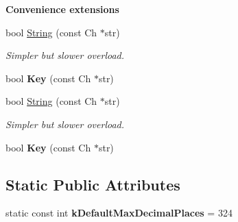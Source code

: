 \begin{Indent}{\bf Convenience extensions}\par
\begin{DoxyCompactItemize}
\item 
bool \hyperlink{class_writer_a24eb1a72b42da5fe51ff99d9c293dd11}{String} (const Ch $\ast$str)\hypertarget{class_writer_a24eb1a72b42da5fe51ff99d9c293dd11}{}\label{class_writer_a24eb1a72b42da5fe51ff99d9c293dd11}

\begin{DoxyCompactList}\small\item\em Simpler but slower overload. \end{DoxyCompactList}\item 
bool {\bfseries Key} (const Ch $\ast$str)\hypertarget{class_writer_a8a40514efe951801df6896a596ed8563}{}\label{class_writer_a8a40514efe951801df6896a596ed8563}

\item 
bool \hyperlink{class_writer_a24eb1a72b42da5fe51ff99d9c293dd11}{String} (const Ch $\ast$str)\hypertarget{class_writer_a24eb1a72b42da5fe51ff99d9c293dd11}{}\label{class_writer_a24eb1a72b42da5fe51ff99d9c293dd11}

\begin{DoxyCompactList}\small\item\em Simpler but slower overload. \end{DoxyCompactList}\item 
bool {\bfseries Key} (const Ch $\ast$str)\hypertarget{class_writer_a8a40514efe951801df6896a596ed8563}{}\label{class_writer_a8a40514efe951801df6896a596ed8563}

\end{DoxyCompactItemize}
\end{Indent}
\subsection*{Static Public Attributes}
\begin{DoxyCompactItemize}
\item 
static const int {\bfseries k\+Default\+Max\+Decimal\+Places} = 324\hypertarget{class_writer_a62cd900eb8391e9423f45375b0ebf3b0}{}\label{class_writer_a62cd900eb8391e9423f45375b0ebf3b0}

\end{DoxyCompactItemize}

